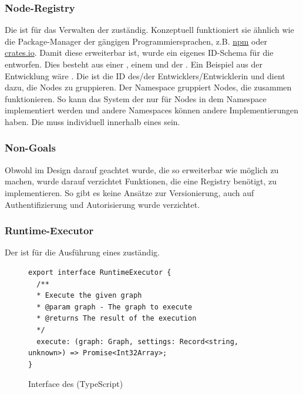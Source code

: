 \documentclass[ngerman]{article}
\begin{document}
\subsubsection{Node-Registry}
\label{sec:node_registry}

Die  ist für das Verwalten der  zuständig. Konzeptuell funktioniert sie ähnlich wie die Package-Manager der gängigen Programmiersprachen, z.B. \href{https://www.npmjs.com/}{npm} oder \href{https://crates.io/}{crates.io}.
\br
Damit diese  erweiterbar ist, wurde ein eigenes ID-Schema für die  entworfen. Dies besteht aus einer , einem  und der . 
Ein Beispiel aus der Entwicklung wäre .
\br
Die  ist die ID des/der Entwicklers/Entwicklerin und dient dazu, die Nodes zu gruppieren. Der Namespace gruppiert Nodes, die zusammen funktionieren. So kann das System der  nur für Nodes in dem  Namespace implementiert werden und andere Namespaces können andere Implementierungen haben.
\br
Die  muss individuell innerhalb eines  sein. 

\subsubsection*{Non-Goals}
Obwohl im Design darauf geachtet wurde, die  so erweiterbar wie möglich zu machen, wurde darauf verzichtet Funktionen, die eine  Registry benötigt, zu implementieren. So gibt es keine Ansätze zur Versionierung, auch auf Authentifizierung und Autorisierung wurde verzichtet.

\pagebreak

\subsubsection{Runtime-Executor}
\label{sec:runtime_executor}

Der  ist für die Ausführung eines  zuständig.

\begin{figure}[htbp]
  \begin{code}
    \begin{verbatim}
export interface RuntimeExecutor {
  /**
  * Execute the given graph
  * @param graph - The graph to execute
  * @returns The result of the execution
  */
  execute: (graph: Graph, settings: Record<string, unknown>) => Promise<Int32Array>;
}
    \end{verbatim}
  \end{code}
  \caption{Interface des  (TypeScript)}
  \label{fig:runtime_executor}
\end{figure}
\end{document}
